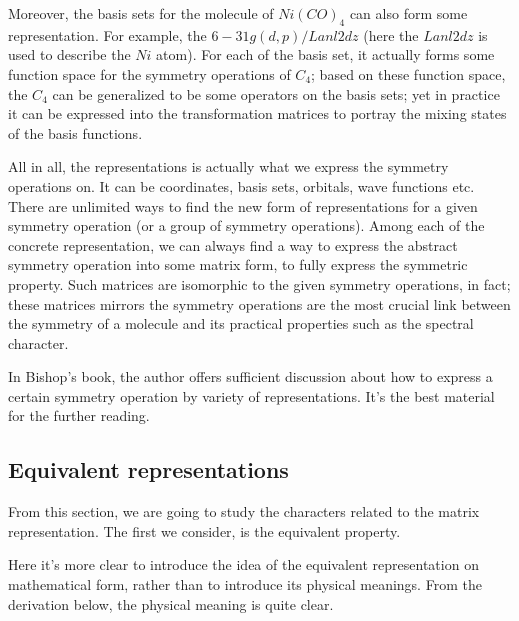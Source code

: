 Moreover, the basis sets for the molecule of $Ni(CO)_{4}$ can also
form some representation. For example, the $6-31g(d,p)/Lanl2dz$ (here
the $Lanl2dz$ is used to describe the $Ni$ atom). For each of the
basis set, it actually forms some function space for the symmetry
operations of $C_{4}$; based on these function space, the $C_{4}$ can
be generalized to be some operators on the basis sets; yet in practice
it can be expressed into the transformation matrices to portray the
mixing states of the basis functions.

All in all, the representations is actually what we express the
symmetry operations on. It can be coordinates, basis sets, orbitals,
wave functions etc. There are unlimited ways to find the new form of
representations for a given symmetry operation (or a group of symmetry
operations). Among each of the concrete representation, we can always
find a way to express the abstract symmetry operation into some matrix
form, to fully express the symmetric property. Such matrices are
isomorphic to the given symmetry operations, in fact; these matrices
mirrors the symmetry operations are the most crucial link between the
symmetry of a molecule and its practical properties such as the
spectral character.

In Bishop's book\cite{Bishop}, the author offers sufficient discussion
about how to express a certain symmetry operation by variety of
representations. It's the best material for the further reading.

\subsection{Equivalent representations}
%
%
From this section, we are going to study the characters related to the
matrix representation. The first we consider, is the equivalent
property.

Here it's more clear to introduce the idea of the equivalent
representation on mathematical form, rather than to introduce its
physical meanings. From the derivation below, the physical meaning is
quite clear.

